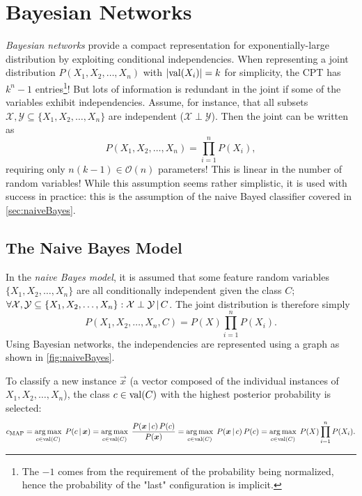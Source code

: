 \chapter{Bayesian Networks}
	\emph{Bayesian networks} provide a compact representation for exponentially-large distribution by exploiting conditional independencies. When representing a joint distribution \( P(X_1, X_2, \dots, X_n) \) with \( \lvert \operatorname{val}(X_i) \rvert = k \) for simplicity, the CPT has \(k^n - 1\) entries\footnote{The \(-1\) comes from the requirement of the probability being normalized, hence the probability of the "last" configuration is implicit.}! But lots of information is redundant in the joint if some of the variables exhibit independencies. Assume, for instance, that all subsets \( \mathcal{X}, \mathcal{Y} \subseteq \{ X_1, X_2, \dots, X_n \} \) are independent (\( \mathcal{X} \perp \mathcal{Y} \)). Then the joint can be written as
	\begin{equation}
		P(X_1, X_2, \dots, X_n) = \prod_{i = 1}^{n} P(X_i),
	\end{equation}
	requiring only \( n (k - 1) \in \mathcal{O}(n) \) parameters! This is linear in the number of random variables! While this assumption seems rather simplistic, it is used with success in practice: this is the assumption of the naive Bayed classifier covered in \autoref{sec:naiveBayes}.

	\section{The Naive Bayes Model}
		\label{sec:naiveBayes}

		In the \emph{naive Bayes model}, it is assumed that some feature random variables \( \{ X_1, X_2, \dots, X_n \} \) are all conditionally independent given the class \(C\); \( \forall \mathcal{X}, \mathcal{Y} \subseteq \{ X_1, X_2, \dots, X_n \} : \mathcal{X} \perp \mathcal{Y} \,\vert\, C \). The joint distribution is therefore simply
		\begin{equation}
			P(X_1, X_2, \dots, X_n, C) = P(X) \prod_{i = 1}^{n} P(X_i).  \label{eq:naiveBayesJoint}
		\end{equation}
		Using Bayesian networks, the independencies are represented using a graph as shown in \autoref{fig:naiveBayes}.

		To classify a new instance \(\vec{x}\) (a vector composed of the individual instances of \(X_1, X_2, \dots, X_n\)), the class \(c \in \operatorname{val}(C)\) with the highest posterior probability is selected:
		\begin{equation}
			c_\mathrm{MAP}
				= \operatorname*{arg\,max}_{c \in \operatorname{val}(C)} \; P(c \,\vert\, \bm{x})
				= \operatorname*{arg\,max}_{c \in \operatorname{val}(C)} \; \frac{P(\bm{x} \,\vert\, c) \, P(c)}{P(\bm{x})}
				= \operatorname*{arg\,max}_{c \in \operatorname{val}(C)} \; P(\bm{x} \,\vert\, c) \, P(c)
				= \operatorname*{arg\,max}_{c \in \operatorname{val}(C)} \; P(X) \prod_{i = 1}^{n} P(X_i).
		\end{equation}

